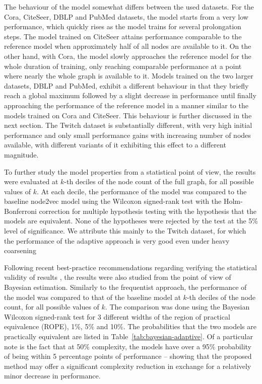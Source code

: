 The behaviour of the model somewhat differs between the used datasets. For the Cora, CiteSeer, DBLP and PubMed datasets, the model starts from a very low performance, which quickly rises as the model trains for several prolongation steps. The model trained on CiteSeer attains performance comparable to the reference model when approximately half of all nodes are available to it. On the other hand, with Cora, the model slowly approaches the reference model for the whole duration of training, only reaching comparable performance at a point where nearly the whole graph is available to it. Models trained on the two larger datasets, DBLP and PubMed, exhibit a different behaviour in that they briefly reach a global maximum followed by a slight decrease in performance until finally approaching the performance of the reference model in a manner similar to the models trained on Cora and CiteSeer. This behaviour is further discussed in the next section. The Twitch dataset is substantially different, with very high initial performance and only small performance gains with increasing number of nodes available, with different variants of it exhibiting this effect to a different magnitude.

To further study the model properties from a statistical point of view, the results were evaluated at \( k \)-th deciles of the node count of the full graph, for all possible values of \( k \). At each decile, the performance of the model was compared to the baseline node2vec model using the Wilcoxon signed-rank test with the Holm-Bonferroni correction for multiple hypothesis testing with the hypothesis that the models are equivalent. None of the hypotheses were rejected by the test at the 5\% level of significance. We attribute this mainly to the Twitch dataset, for which the performance of the adaptive approach is very good even under heavy coarsening

Following recent best-practice recommendations regarding verifying the statistical validity of results \cite{benavoli_time_2017}, the results were also studied from the point of view of Bayesian estimation. Similarly to the frequentist approach, the performance of the model was compared to that of the baseline model at \( k \)-th deciles of the node count, for all possible values of \( k \). The comparison was done using the Bayesian Wilcoxon signed-rank test \cite{benavoli_bayesian_2014} for 3 different widths of the region of practical equivalence (ROPE), 1\%, 5\% and 10\%. The probabilities that the two models are practically equivalent are listed in Table~\ref{tab:bayesian-adaptive}. Of a particular note is the fact that at 50\% complexity, the models have over a 95\% probability of being within 5 percentage points of performance -- showing that the proposed method may offer a significant complexity reduction in exchange for a relatively minor decrease in performance.


